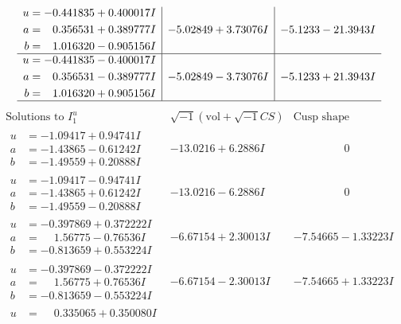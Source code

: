 \documentclass[1p]{elsarticle_modified}
\theoremstyle{definition}
\newcommand{\I}{\sqrt{-1}}
\begin{document}
$$\begin{array}{c|c|c}
\begin{aligned}
u &= -0.441835 + 0.400017 I \\
a &= \phantom{-}0.356531 + 0.389777 I \\
b &= \phantom{-}1.016320 - 0.905156 I\end{aligned}
 & -5.02849 + 3.73076 I & -5.1233 - 21.3943 I \\ \hline\begin{aligned}
u &= -0.441835 - 0.400017 I \\
a &= \phantom{-}0.356531 - 0.389777 I \\
b &= \phantom{-}1.016320 + 0.905156 I\end{aligned}
 & -5.02849 - 3.73076 I & -5.1233 + 21.3943 I\\
 \hline 
 \end{array}$$\newpage$$\begin{array}{c|c|c}  
\text{Solutions to }I^u_{1}& \I (\text{vol} + \sqrt{-1}CS) & \text{Cusp shape}\\
 \hline 
\begin{aligned}
u &= -1.09417 + 0.94741 I \\
a &= -1.43865 - 0.61242 I \\
b &= -1.49559 + 0.20888 I\end{aligned}
 & -13.0216 + 6.2886 I & \phantom{-0.000000 } 0 \\ \hline\begin{aligned}
u &= -1.09417 - 0.94741 I \\
a &= -1.43865 + 0.61242 I \\
b &= -1.49559 - 0.20888 I\end{aligned}
 & -13.0216 - 6.2886 I & \phantom{-0.000000 } 0 \\ \hline\begin{aligned}
u &= -0.397869 + 0.372222 I \\
a &= \phantom{-}1.56775 - 0.76536 I \\
b &= -0.813659 + 0.553224 I\end{aligned}
 & -6.67154 + 2.30013 I & -7.54665 - 1.33223 I \\ \hline\begin{aligned}
u &= -0.397869 - 0.372222 I \\
a &= \phantom{-}1.56775 + 0.76536 I \\
b &= -0.813659 - 0.553224 I\end{aligned}
 & -6.67154 - 2.30013 I & -7.54665 + 1.33223 I \\ \hline\begin{aligned}
u &= \phantom{-}0.335065 + 0.350080 I \\

\end{aligned}
\end{array}$$
\end{document}
